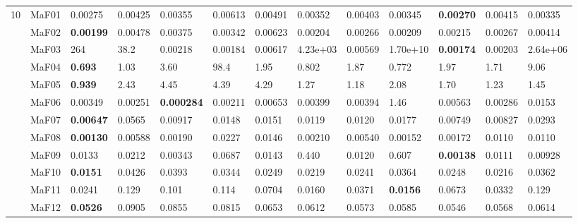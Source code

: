 \documentclass[]{article}
\begin{document}
\begin{landscape}
\begin{table}
\begin{footnotesize}
\begin{tabular}{|l|l|l|l|l|l|l|l|l|l|l|l|l|}
\multirow{15}{*}{10} & MaF01 & \cellcolor{gray95} 0.00275 & 0.00425 & 0.00355 & 0.00613 & 0.00491 & 0.00352 & 0.00403 & \cellcolor{gray95} 0.00345 & \cellcolor{gray95} {\bf 0.00270} & 0.00415 & \cellcolor{gray95} 0.00335\\
 & MaF02 & \cellcolor{gray95} {\bf 0.00199} & 0.00478 & 0.00375 & 0.00342 & 0.00623 & \cellcolor{gray95} 0.00204 & 0.00266 & \cellcolor{gray95} 0.00209 & \cellcolor{gray95} 0.00215 & 0.00267 & 0.00414\\
 & MaF03 & 264 & 38.2 & 0.00218 & \cellcolor{gray95} 0.00184 & 0.00617 & 4.23e+03 & 0.00569 & 1.70e+10 & \cellcolor{gray95} {\bf 0.00174} & \cellcolor{gray95} 0.00203 & 2.64e+06\\
 & MaF04 & \cellcolor{gray95} {\bf 0.693} & \cellcolor{gray95} 1.03 & 3.60 & 98.4 & 1.95 & \cellcolor{gray95} 0.802 & 1.87 & \cellcolor{gray95} 0.772 & 1.97 & 1.71 & 9.06\\
 & MaF05 & \cellcolor{gray95} {\bf 0.939} & 2.43 & 4.45 & 4.39 & 4.29 & \cellcolor{gray95} 1.27 & \cellcolor{gray95} 1.18 & 2.08 & 1.70 & \cellcolor{gray95} 1.23 & \cellcolor{gray95} 1.45\\
 & MaF06 & 0.00349 & \cellcolor{gray95} 0.00251 & \cellcolor{gray95} {\bf 0.000284} & \cellcolor{gray95} 0.00211 & 0.00653 & 0.00399 & 0.00394 & 1.46 & 0.00563 & 0.00286 & \cellcolor{gray95} 0.0153\\
 & MaF07 & \cellcolor{gray95} {\bf 0.00647} & 0.0565 & \cellcolor{gray95} 0.00917 & 0.0148 & 0.0151 & 0.0119 & 0.0120 & 0.0177 & \cellcolor{gray95} 0.00749 & \cellcolor{gray95} 0.00827 & 0.0293\\
 & MaF08 & \cellcolor{gray95} {\bf 0.00130} & 0.00588 & \cellcolor{gray95} 0.00190 & 0.0227 & 0.0146 & 0.00210 & 0.00540 & \cellcolor{gray95} 0.00152 & \cellcolor{gray95} 0.00172 & 0.0110 & 0.0110\\
 & MaF09 & 0.0133 & 0.0212 & \cellcolor{gray95} 0.00343 & 0.0687 & 0.0143 & 0.440 & 0.0120 & 0.607 & \cellcolor{gray95} {\bf 0.00138} & 0.0111 & \cellcolor{gray95} 0.00928\\
 & MaF10 & \cellcolor{gray95} {\bf 0.0151} & 0.0426 & 0.0393 & 0.0344 & \cellcolor{gray95} 0.0249 & \cellcolor{gray95} 0.0219 & 0.0241 & 0.0364 & 0.0248 & \cellcolor{gray95} 0.0216 & 0.0362\\
 & MaF11 & \cellcolor{gray95} 0.0241 & 0.129 & 0.101 & 0.114 & 0.0704 & \cellcolor{gray95} 0.0160 & \cellcolor{gray95} 0.0371 & \cellcolor{gray95} {\bf 0.0156} & 0.0673 & \cellcolor{gray95} 0.0332 & 0.129\\
 & MaF12 & \cellcolor{gray95} {\bf 0.0526} & 0.0905 & 0.0855 & 0.0815 & 0.0653 & 0.0612 & \cellcolor{gray95} 0.0573 & 0.0585 & \cellcolor{gray95} 0.0546 & \cellcolor{gray95} 0.0568 & 0.0614\\

\end{tabular}
\end{footnotesize}
\end{table}
\end{landscape}
\end{document}
